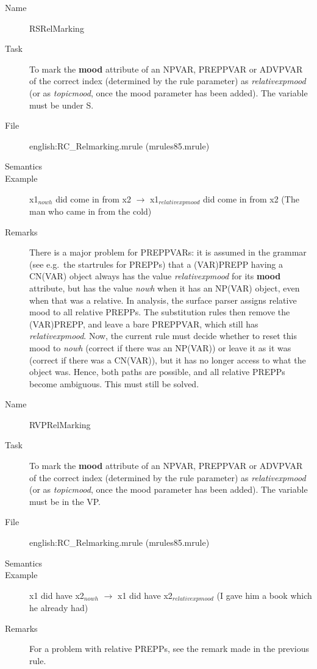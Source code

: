 \begin{description}
\vspace{1 cm}
\begin{description}
\item[Name] RSRelMarking
\item[Task] To mark the {\bf mood} attribute of an NPVAR, PREPPVAR or 
ADVPVAR of the correct 
index (determined by the rule parameter) as {\em relativexpmood\/} (or as {\em 
topicmood\/}, once the mood parameter has been added). The 
variable must be under S.
\item[File] english:RC\_Relmarking.mrule (mrules85.mrule)
\item[Semantics] 
\item[Example] x1$_{nowh}$ did come in from x2 $\rightarrow$ 
x1$_{relativexpmood}$ did come in from x2 (The man who came in from the cold)
\item[Remarks] There is a major problem for PREPPVARs: it is assumed in the 
grammar (see e.g.\ the startrules for PREPPs) that a
(VAR)PREPP having a CN(VAR) object always has the value {\em relativexpmood\/} 
for its {\bf mood} attribute, but has the value {\em nowh\/} when it has an 
NP(VAR) object, even when that was a relative. In analysis, the surface parser 
assigns relative mood to all relative PREPPs. The substitution 
rules then remove the (VAR)PREPP, and leave a bare PREPPVAR, which still has 
{\em relativexpmood\/}. Now, the current rule must decide whether to reset 
this mood to {\em nowh\/} (correct if there was an NP(VAR)) or leave it as it 
was (correct if there was a CN(VAR)), but it has no longer access to what the
object was. Hence, both paths are possible, and all relative PREPPs become 
ambiguous. This must still be solved.
\end{description}

\vspace{1 cm}
\begin{description}
\item[Name] RVPRelMarking
\item[Task] To mark the {\bf mood} attribute of an NPVAR, PREPPVAR or ADVPVAR
 of the correct 
index (determined by the rule parameter) as {\em relativexpmood\/} (or as {\em 
topicmood\/}, once the mood parameter has been added). The 
variable must be in the VP.
\item[File] english:RC\_Relmarking.mrule (mrules85.mrule)
\item[Semantics]
\item[Example] x1 did have x2$_{nowh}$ $\rightarrow$ x1 did have 
x2$_{relativexpmood}$ (I gave him a book which he already had)
\item[Remarks] For a problem with relative PREPPs, see the remark made in the 
previous rule.
\end{description}


\end{description}
